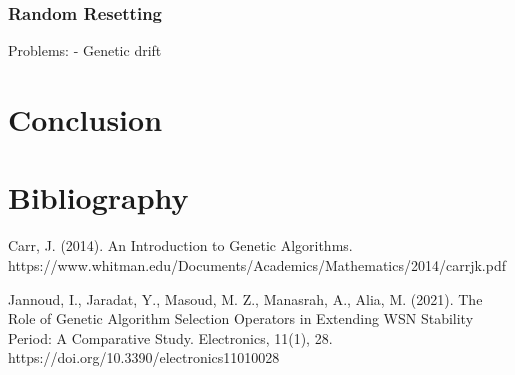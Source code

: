 \documentclass{article}
\begin{document}
\subsubsection{Random Resetting}
Problems:
- Genetic drift

\newpage
\section{Conclusion}

\newpage
\section{Bibliography}
Carr, J. (2014). An Introduction to Genetic Algorithms.\smallbreak
https://www.whitman.edu/Documents/Academics/Mathematics/2014/carrjk.pdf

Jannoud, I., Jaradat, Y., Masoud, M. Z., Manasrah, A., Alia, M. (2021). The Role of Genetic Algorithm Selection Operators in Extending WSN Stability Period: A Comparative Study. Electronics, 11(1), 28. https://doi.org/10.3390/electronics11010028‌
\end{document}
